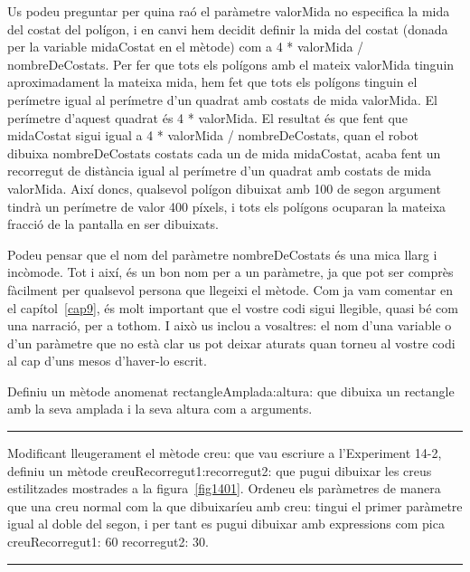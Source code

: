 Us podeu preguntar per quina raó el paràmetre \textsf{valorMida} no especifica la mida del costat del polígon, i en canvi hem decidit definir la mida del costat (donada per la variable \textsf{midaCostat} en el mètode) com a \textsf{4 * valorMida / nombreDeCostats}. Per fer que tots els polígons amb el mateix \textsf{valorMida} tinguin aproximadament la mateixa mida, hem fet que tots els polígons tinguin el perímetre igual al perímetre d'un quadrat amb costats de mida \textsf{valorMida}. El perímetre d'aquest quadrat és \textsf{4 * valorMida}. El resultat és que fent que \textsf{midaCostat} sigui igual a \textsf{4 * valorMida / nombreDeCostats}, quan el robot dibuixa \textsf{nombreDeCostats} costats cada un de mida \textsf{midaCostat}, acaba fent un recorregut de distància igual al perímetre d'un quadrat amb costats de mida \textsf{valorMida}.
Així doncs, qualsevol polígon dibuixat amb \textsf{100} de segon argument tindrà un perímetre de valor \textsf{400} píxels, i tots els polígons ocuparan la mateixa fracció de la pantalla en ser dibuixats.

Podeu pensar que el nom del paràmetre \textsf{nombreDeCostats} és una mica llarg i incòmode. Tot i així, és un bon nom per a un paràmetre, ja que pot ser comprès fàcilment per qualsevol persona que llegeixi el mètode. Com ja vam comentar en el capítol~\ref{cap9}, és molt important que el vostre codi sigui llegible, quasi bé com una narració, per a tothom. I això us inclou a vosaltres: el nom d'una variable o d'un paràmetre que no està clar us pot deixar aturats quan torneu al vostre codi al cap d'uns mesos d'haver-lo escrit.

\begin{center}
\colorbox{black}{}
\end{center}
{\small
\noindent
Definiu un mètode anomenat \textsf{rectangleAmplada:altura:} que dibuixa un rectangle amb la seva amplada i la seva altura com a arguments.}\\
\noindent
\rule{\textwidth}{3pt}
\newpage
\begin{center}
\colorbox{black}{}
\end{center}
{\small
\noindent
Modificant lleugerament el mètode \textsf{creu:} que vau escriure a l'Experiment 14-2, definiu un mètode \textsf{creuRecorregut1:recorregut2:}  que pugui dibuixar les creus estilitzades mostrades a la figura~\ref{fig1401}. Ordeneu els paràmetres de manera que una creu normal com la que dibuixaríeu amb \textsf{creu:} tingui el primer paràmetre igual al doble del segon, i per tant es pugui dibuixar amb expressions com \textsf{pica creuRecorregut1: 60 recorregut2: 30}.}\\
\noindent
\rule{\textwidth}{3pt}

